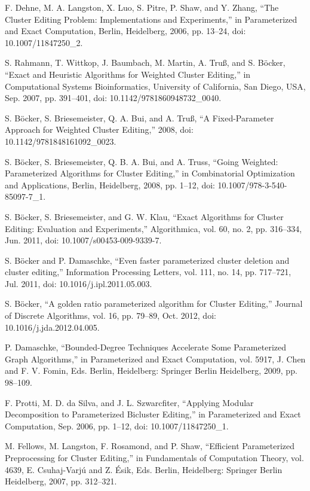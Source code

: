 \documentclass[12pt,oneside,english,parskip=full,headings=small]{scrbook}
\theoremstyle{definition}
\begin{document}
\begin{thebibliography}{99}
F. Dehne, M. A. Langston, X. Luo, S. Pitre, P. Shaw, and Y. Zhang, “The Cluster Editing Problem:
Implementations and Experiments,” in Parameterized and Exact Computation, Berlin, Heidelberg, 2006,
pp. 13–24, doi: 10.1007/11847250\_2.

S. Rahmann, T. Wittkop, J. Baumbach, M. Martin, A. Truß, and S. Böcker, “Exact and Heuristic
Algorithms for Weighted Cluster Editing,” in Computational Systems Bioinformatics, University of
California, San Diego, USA, Sep. 2007, pp. 391–401, doi: 10.1142/9781860948732\_0040.

S. Böcker, S. Briesemeister, Q. A. Bui, and A. Truß, “A Fixed-Parameter Approach for Weighted
Cluster Editing,” 2008, doi: 10.1142/9781848161092\_0023.

S. Böcker, S. Briesemeister, Q. B. A. Bui, and A. Truss, “Going Weighted: Parameterized
Algorithms for Cluster Editing,” in Combinatorial Optimization and Applications, Berlin, Heidelberg,
2008, pp. 1–12, doi: 10.1007/978-3-540-85097-7\_1.

S. Böcker, S. Briesemeister, and G. W. Klau, “Exact Algorithms for Cluster Editing: Evaluation
and Experiments,” Algorithmica, vol. 60, no. 2, pp. 316–334, Jun. 2011, doi:
10.1007/s00453-009-9339-7.

S. Böcker and P. Damaschke, “Even faster parameterized cluster deletion and cluster editing,”
Information Processing Letters, vol. 111, no. 14, pp. 717–721, Jul. 2011, doi:
10.1016/j.ipl.2011.05.003.

S. Böcker, “A golden ratio parameterized algorithm for Cluster Editing,” Journal of Discrete
Algorithms, vol. 16, pp. 79–89, Oct. 2012, doi: 10.1016/j.jda.2012.04.005.

P. Damaschke, “Bounded-Degree Techniques Accelerate Some Parameterized Graph Algorithms,” in
Parameterized and Exact Computation, vol. 5917, J. Chen and F. V. Fomin, Eds. Berlin, Heidelberg:
Springer Berlin Heidelberg, 2009, pp. 98–109.

F. Protti, M. D. da Silva, and J. L. Szwarcfiter, “Applying Modular Decomposition to
Parameterized Bicluster Editing,” in Parameterized and Exact Computation, Sep. 2006, pp. 1–12, doi:
10.1007/11847250\_1.

M. Fellows, M. Langston, F. Rosamond, and P. Shaw, “Efficient Parameterized Preprocessing for
Cluster Editing,” in Fundamentals of Computation Theory, vol. 4639, E. Csuhaj-Varjú and Z. Ésik,
Eds. Berlin, Heidelberg: Springer Berlin Heidelberg, 2007, pp. 312–321.


\end{thebibliography}
\end{document}
